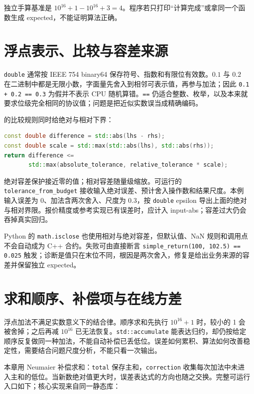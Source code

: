 独立手算基准是 $10^{16}+1-10^{16}+3=4$。程序若只打印“计算完成”或拿同一个函数生成 expected，不能证明算法正确。

\section{浮点表示、比较与容差来源}

\texttt{double} 通常按 IEEE 754 binary64 保存符号、指数和有限位有效数。$0.1$ 与 $0.2$ 在二进制中都是无限小数，字面量先舍入到相邻可表示值，再参与加法；因此 \texttt{0.1 + 0.2 == 0.3} 为假并不表示 CPU 随机算错。\texttt{==} 仍适合整数、枚举，以及本来就要求位级完全相同的协议值；问题是把近似实数误当成精确编码。

 的比较规则同时给绝对与相对下界：

\begin{lstlisting}[language=C++,numbers=none]
const double difference = std::abs(lhs - rhs);
const double scale = std::max(std::abs(lhs), std::abs(rhs));
return difference <=
       std::max(absolute_tolerance, relative_tolerance * scale);
\end{lstlisting}

绝对容差保护接近零的值；相对容差随量级缩放。可运行的 \texttt{tolerance\_from\_budget} 接收输入绝对误差、预计舍入操作数和结果尺度。本例输入误差为 0、加法含两次舍入、尺度为 0.3，按 \texttt{double} epsilon 导出上面的绝对与相对界限。报价精度或参考实现已有误差时，应计入 input-abs；容差过大仍会吞掉真实回归。

Python 的 \texttt{math.isclose} 也使用相对与绝对容差，但默认值、NaN 规则和调用点不会自动成为 C++ 合约。失败可由直接断言 \texttt{simple\_return(100, 102.5) == 0.025} 触发；诊断是值只在末位不同，根因是两次舍入，修复是给出业务来源的容差并保留独立 expected。

\section{求和顺序、补偿项与在线方差}

浮点加法不满足实数意义下的结合律。顺序求和先执行 $10^{16}+1$ 时，较小的 1 会被舍掉；之后再减 $10^{16}$ 已无法恢复。\texttt{std::accumulate} 能表达归约，却仍按给定顺序反复做同一种加法，不能自动补偿已丢低位。误差如何累积、算法如何改善稳定性，需要结合问题尺度分析，不能只看一次输出\autocite{higham2002accuracy}。

本章用 Neumaier 补偿求和：\texttt{total} 保存主和，\texttt{correction} 收集每次加法中未进入主和的低位。当新数绝对值更大时，误差表达式的方向也随之交换。完整可运行入口如下；核心实现来自同一静态库：


